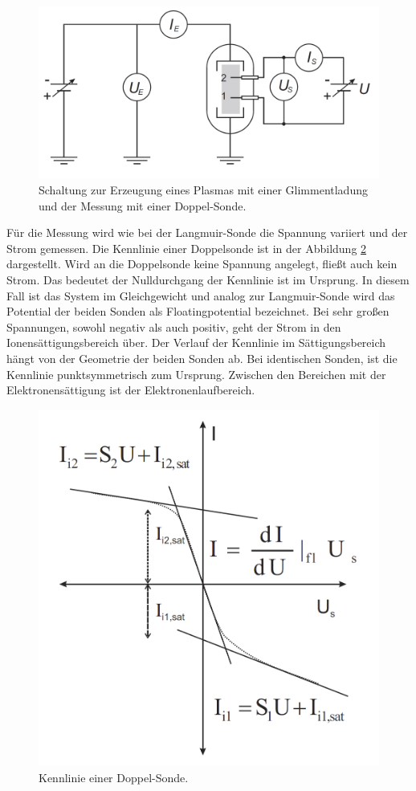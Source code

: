 \begin{figure}[H]
\centering
\includegraphics[scale=0.4]{Schaltung_Doppel_Sonde.png}
\caption{Schaltung zur Erzeugung eines Plasmas mit einer Glimmentladung und der Messung mit einer Doppel-Sonde. \cite{anleitung}}
\label{fig:Schaltung_Doppel_Sonde}
\end{figure}
Für die Messung wird wie bei der Langmuir-Sonde die Spannung variiert und der Strom gemessen.  Die Kennlinie einer Doppelsonde ist in der Abbildung \ref{fig:Kennlinie_Doppel_Sonde} dargestellt. Wird an die Doppelsonde keine Spannung angelegt, fließt auch kein Strom. Das bedeutet der Nulldurchgang der Kennlinie ist im Ursprung.  In diesem Fall ist das System im Gleichgewicht und analog zur Langmuir-Sonde wird das Potential der beiden Sonden als Floatingpotential bezeichnet. Bei sehr großen Spannungen, sowohl negativ als auch positiv, geht der Strom in den Ionensättigungsbereich über. Der Verlauf der Kennlinie im Sättigungsbereich hängt von der Geometrie der beiden Sonden ab. Bei identischen Sonden, ist die Kennlinie punktsymmetrisch zum Ursprung. Zwischen den Bereichen mit der Elektronensättigung ist der Elektronenlaufbereich. 
\begin{figure}[H]
\centering
\includegraphics[scale=0.4]{Kennlinie_Doppel_Sonde.png}
\caption{Kennlinie einer Doppel-Sonde. \cite{anleitung}}
\label{fig:Kennlinie_Doppel_Sonde}
\end{figure}
